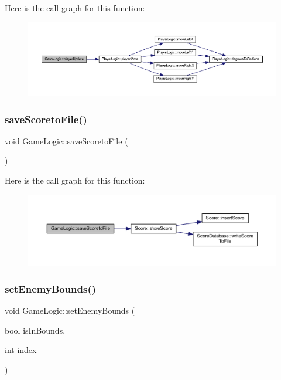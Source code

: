 Here is the call graph for this function\+:
\nopagebreak
\begin{figure}[H]
\begin{center}
\leavevmode
\includegraphics[width=350pt]{class_game_logic_a3bb909e55fc7c811aa0e3e6a92b881bb_cgraph}
\end{center}
\end{figure}
\mbox{\label{class_game_logic_a594da37684d54d619214e8f96b80279c}} 
\subsubsection{\texorpdfstring{save\+Scoreto\+File()}{saveScoretoFile()}}
{\footnotesize\ttfamily void Game\+Logic\+::save\+Scoreto\+File (\begin{DoxyParamCaption}{ }\end{DoxyParamCaption})}

Here is the call graph for this function\+:
\nopagebreak
\begin{figure}[H]
\begin{center}
\leavevmode
\includegraphics[width=350pt]{class_game_logic_a594da37684d54d619214e8f96b80279c_cgraph}
\end{center}
\end{figure}
\mbox{\label{class_game_logic_a48f8e18378ed00053d83da991fcad264}} 
\subsubsection{\texorpdfstring{set\+Enemy\+Bounds()}{setEnemyBounds()}}
{\footnotesize\ttfamily void Game\+Logic\+::set\+Enemy\+Bounds (\begin{DoxyParamCaption}\item[{bool}]{is\+In\+Bounds,  }\item[{int}]{index }\end{DoxyParamCaption})}

